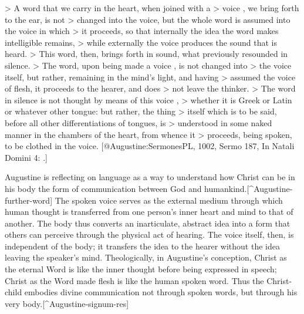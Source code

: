 > A word  that we carry in the heart, when joined with a
> voice , we bring forth to the ear, is not
> changed into the voice, but the whole word is assumed into the voice in which
> it proceeds, so that internally the idea the word makes intelligible remains,
> while externally the voice produces the sound that is heard.
> This word, then, brings forth in sound, what previously resounded in silence.
> The word, upon being made a voice , is not changed into
> the voice itself, but rather, remaining in the mind's light, and having
> assumed the voice  of flesh, it proceeds to the hearer, and does
> not leave the thinker.
> The word in silence is not thought by means of this voice ,
> whether it is Greek or Latin or whatever other tongue: but rather, the thing
> itself which is to be said, before all other differentiations of tongues, is
> understood in some naked manner in the chambers of the heart, from whence it
> proceeds, being spoken, to be clothed in the voice.
[@Augustine:SermonesPL, 1002, Sermo 187, In Natali Domini 4:
.] 

\noindent
Augustine is reflecting on language as a way to understand how Christ can be in
his body the form of communication between God and
humankind.[^Augustine-further-word]
The spoken voice serves as the external medium through which human thought is
transferred from one person's inner heart and mind to that of another.
The body thus converts an inarticulate, abstract idea into a form that others
can perceive through the physical act of hearing.
The voice itself, then, is independent of the body; it transfers the idea
to the hearer without the idea leaving the speaker's mind.
Theologically, in Augustine's conception, Christ as the eternal Word is like
the inner thought before being expressed in speech; Christ as the Word made
flesh is like the human spoken word.
Thus the Christ-child embodies divine communication not through spoken words,
but through his very body.[^Augustine-signum-res]

